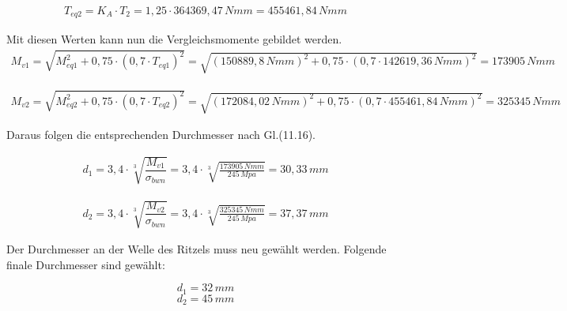 \documentclass[15pt,a4paper]{article}
\begin{document}
     \begin{align*}
     	T_{eq2}=K_{A} \cdot T_{2}=1,25 \cdot 364369,47\,Nmm =455461,84\,Nmm
     \end{align*}
     
     Mit diesen Werten kann nun die Vergleichsmomente gebildet werden.
     \begin{align*}
     	M_{v1}=\sqrt{M_{eq1}^{2}+0,75 \cdot (0,7 \cdot T_{eq1})^{2}}=\sqrt{(150889,8\,Nmm)^{2}+0,75 \cdot (0,7 \cdot 142619,36 \,Nmm )^{2}}=173905\,Nmm
     \end{align*}
     
     \begin{align*}
     	M_{v2}=\sqrt{M_{eq2}^{2}+0,75 \cdot (0,7 \cdot T_{eq2})^{2}}=\sqrt{(172084,02\,Nmm)^{2}+0,75 \cdot (0,7 \cdot 455461,84\,Nmm)^{2}}=325345\,Nmm
     \end{align*}
     
     Daraus folgen die entsprechenden Durchmesser nach Gl.(11.16).
     
     \begin{align*}
     	d_{1}=3,4 \cdot \sqrt [3]{\dfrac{M_{v1}}{\sigma_{bwn}}} = 3,4 \cdot \sqrt[3]{\frac{173905\,Nmm}{245 \,Mpa}}=30,33\,mm
     \end{align*}
     
     \begin{align*}
     	d_{2}=3,4 \cdot \sqrt [3]{\dfrac{M_{v2}}{\sigma_{bwn}}} = 3,4 \cdot \sqrt[3]{\frac{325345\,Nmm}{245 \,Mpa}}=37,37\,mm
     \end{align*}
     
     Der Durchmesser an der Welle des Ritzels muss neu gewählt werden. Folgende finale Durchmesser sind gewählt:
     
     $$d_{1}=32\,mm$$
     $$d_{2}=45\,mm$$
     \newpage
\end{document}
